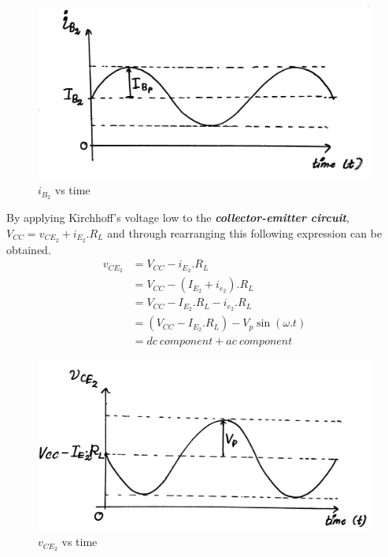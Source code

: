 \documentclass[a4paper,11pt]{article}%
\begin{document}
\begin{figure}[!h]
	\centering
	\includegraphics[scale=0.1]{figures/modiB2}
	\caption{$i_{B_2}$ vs time}
\end{figure}




By applying Kirchhoff's voltage low to the \textbf{\textit{collector-emitter circuit}}, $V_{CC} = v_{CE_2} + i_{E_2}.R_L$ and through rearranging this following expression can be obtained.
\[
\begin{split}
v_{CE_2} &=	V_{CC} - i_{E_2}.R_L\\
	&= V_{CC} -\left( I_{E_2} + i_{e_2} \right).R_L\\
& = V_{CC} - I_{E_2}.R_L - i_{e_2}.R_L\\
&= \left(V_{CC} - I_{E_2}.R_L \right) - V_p\sin(\omega.t)\\
&= dc~component + ac~component
\end{split}
\]


\begin{figure}[!h]
	\centering
	\includegraphics[scale=0.1]{figures/modvCE2}
	\caption{$v_{CE_2}$ vs time}
\end{figure}
\end{document}

